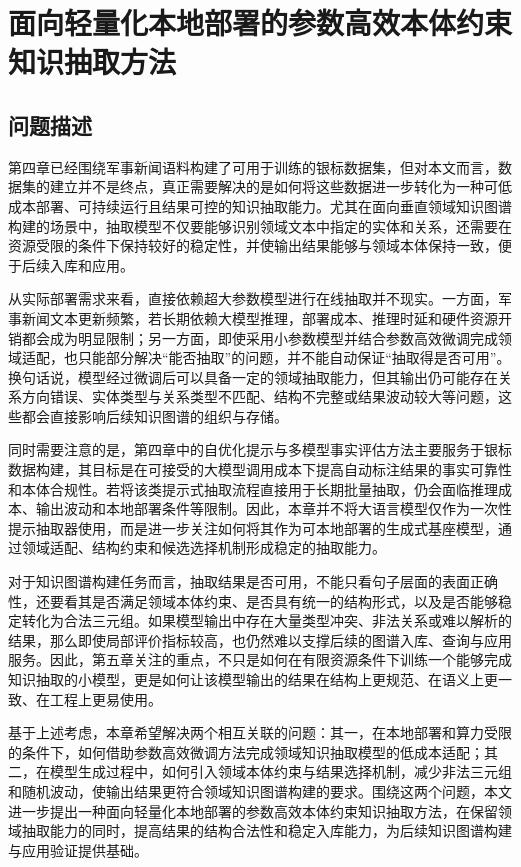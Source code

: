 
\chapter{面向轻量化本地部署的参数高效本体约束知识抽取方法}
\label{chap:lightweight-ke}

\section{问题描述}

第四章已经围绕军事新闻语料构建了可用于训练的银标数据集，但对本文而言，数据集的建立并不是终点，真正需要解决的是如何将这些数据进一步转化为一种可低成本部署、可持续运行且结果可控的知识抽取能力。尤其在面向垂直领域知识图谱构建的场景中，抽取模型不仅要能够识别领域文本中指定的实体和关系，还需要在资源受限的条件下保持较好的稳定性，并使输出结果能够与领域本体保持一致，便于后续入库和应用。

从实际部署需求来看，直接依赖超大参数模型进行在线抽取并不现实。一方面，军事新闻文本更新频繁，若长期依赖大模型推理，部署成本、推理时延和硬件资源开销都会成为明显限制；另一方面，即使采用小参数模型并结合参数高效微调完成领域适配，也只能部分解决“能否抽取”的问题，并不能自动保证“抽取得是否可用”。换句话说，模型经过微调后可以具备一定的领域抽取能力，但其输出仍可能存在关系方向错误、实体类型与关系类型不匹配、结构不完整或结果波动较大等问题，这些都会直接影响后续知识图谱的组织与存储。

同时需要注意的是，第四章中的自优化提示与多模型事实评估方法主要服务于银标数据构建，其目标是在可接受的大模型调用成本下提高自动标注结果的事实可靠性和本体合规性。若将该类提示式抽取流程直接用于长期批量抽取，仍会面临推理成本、输出波动和本地部署条件等限制。因此，本章并不将大语言模型仅作为一次性提示抽取器使用，而是进一步关注如何将其作为可本地部署的生成式基座模型，通过领域适配、结构约束和候选选择机制形成稳定的抽取能力。

对于知识图谱构建任务而言，抽取结果是否可用，不能只看句子层面的表面正确性，还要看其是否满足领域本体约束、是否具有统一的结构形式，以及是否能够稳定转化为合法三元组。如果模型输出中存在大量类型冲突、非法关系或难以解析的结果，那么即使局部评价指标较高，也仍然难以支撑后续的图谱入库、查询与应用服务。因此，第五章关注的重点，不只是如何在有限资源条件下训练一个能够完成知识抽取的小模型，更是如何让该模型输出的结果在结构上更规范、在语义上更一致、在工程上更易使用。

基于上述考虑，本章希望解决两个相互关联的问题：其一，在本地部署和算力受限的条件下，如何借助参数高效微调方法完成领域知识抽取模型的低成本适配；其二，在模型生成过程中，如何引入领域本体约束与结果选择机制，减少非法三元组和随机波动，使输出结果更符合领域知识图谱构建的要求。围绕这两个问题，本文进一步提出一种面向轻量化本地部署的参数高效本体约束知识抽取方法，在保留领域抽取能力的同时，提高结果的结构合法性和稳定入库能力，为后续知识图谱构建与应用验证提供基础。

